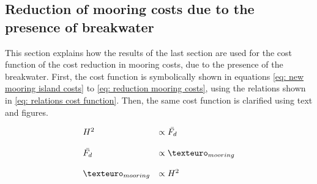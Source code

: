 \subsection{Reduction of mooring costs due to the presence of breakwater}
\label{subsec: reduction mooring costs function}
This section explains how the results of the last section are used for the cost function of the cost reduction in mooring costs, due to the presence of the breakwater. First, the cost function is symbolically shown in equations \ref{eq: new mooring island costs} to \ref{eq: reduction mooring costs}, using the relations shown in \ref{eq: relations cost function}. Then, the same cost function is clarified using text and figures.





\begin{equation}
\begin{array}{lll}
    H^2 & \propto \bar{F_d}\\
    \\
    \bar{F_d} & \propto \texteuro_{mooring} \\
    \\
    \texteuro_{mooring} & \propto H^2
\end{array}
\label{eq: relations cost function}
\end{equation}



